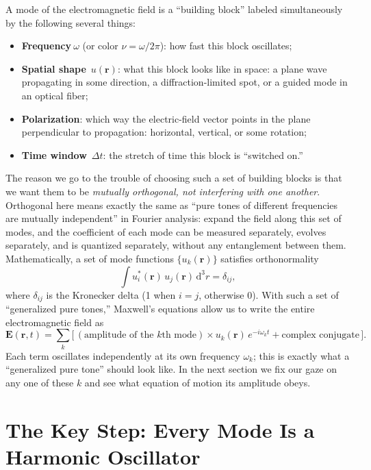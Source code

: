 A mode of the electromagnetic field is a ``building block'' labeled simultaneously by the following several things:

\begin{itemize}
  \item \textbf{Frequency}\(\ \omega\) (or color \(\nu=\omega/2\pi\)): how fast this block oscillates;
  \item \textbf{Spatial shape}\ \(u(\bm r)\): what this block looks like in space: a plane wave propagating in some direction, a diffraction-limited spot, or a guided mode in an optical fiber;
  \item \textbf{Polarization}: which way the electric-field vector points in the plane perpendicular to propagation: horizontal, vertical, or some rotation;
  \item \textbf{Time window}\ \(\Delta t\): the stretch of time this block is ``switched on.''
\end{itemize}

The reason we go to the trouble of choosing such a set of building blocks is that we want them to be \emph{mutually orthogonal, not interfering with one another}. Orthogonal here means exactly the same as ``pure tones of different frequencies are mutually independent'' in Fourier analysis: expand the field along this set of modes, and the coefficient of each mode can be measured separately, evolves separately, and is quantized separately, without any entanglement between them. Mathematically, a set of mode functions \(\{u_k(\bm r)\}\) satisfies orthonormality
\[
  \int u_i^*(\bm r)\,u_j(\bm r)\,\mathrm d^3r=\delta_{ij},
\]
where \(\delta_{ij}\) is the Kronecker delta (1 when \(i=j\), otherwise 0). With such a set of ``generalized pure tones,'' Maxwell's equations allow us to write the entire electromagnetic field as
\[
  \bm E(\bm r,t)=\sum_k\big[\,(\text{amplitude of the }k\text{th mode})\times u_k(\bm r)\,e^{-i\omega_k t}+\text{complex conjugate}\,\big].
\]
Each term oscillates independently at its own frequency \(\omega_k\); this is exactly what a ``generalized pure tone'' should look like. In the next section we fix our gaze on any one of these \(k\) and see what equation of motion its amplitude obeys.

\section{The Key Step: Every Mode Is a Harmonic Oscillator}
\label{sec:e05-mode-is-oscillator}

